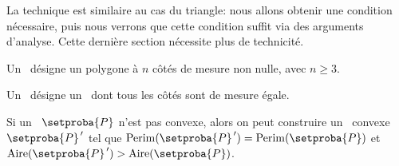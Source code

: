 La technique est similaire au cas du triangle: nous allons obtenir une condition nécessaire, puis nous verrons que cette condition suffit via des arguments d'analyse. Cette dernière section nécessite plus de technicité.




\begin{defi}
	Un \og \emph{\ngone} \fg\ désigne un polygone à $n$ côtés de mesure non nulle, avec $n \geq 3$.
\end{defi}


\begin{defi}
	Un \og \emph{\niso} \fg\ désigne un \ngone\ dont tous les côtés sont de mesure égale.
\end{defi}




\begin{fact} \label{conv-poly}
	Si un \ngone\ $\setproba{P}$ n'est pas convexe, alors on peut construire un \ngone\ convexe $\setproba{P}^{\,\prime}$ tel que 
	$\perim{\setproba{P}^{\,\prime}} = \perim{\setproba{P}}$ 
	et 
	$\area{\setproba{P}^{\,\prime}} > \area{\setproba{P}}$.
\end{fact}


